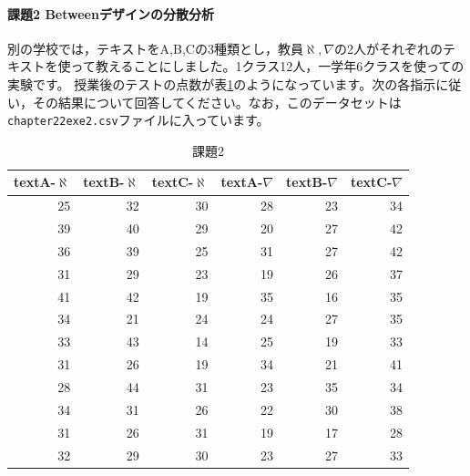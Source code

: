 \documentclass{ltjbook}
\begin{document}
\paragraph{課題2 Betweenデザインの分散分析}
別の学校では，テキストをA,B,Cの3種類とし，教員$\aleph,\nabla$の2人がそれぞれのテキストを使って教えることにしました。1クラス12人，一学年6クラスを使っての実験です。
授業後のテストの点数が表\ref{L23::exe2}のようになっています。次の各指示に従い，その結果について回答してください。なお，このデータセットは\texttt{chapter22exe2.csv}ファイルに入っています。
\begin{table}[ht]
	\centering
	\caption{課題2}
	\begin{tabular}{rrrrrr}
		\hline
		textA-$\aleph$ & textB-$\aleph$ & textC-$\aleph$ & textA-$\nabla$ & textB-$\nabla$ & textC-$\nabla$ \\
		\hline
		25             & 32             & 30             & 28             & 23             & 34             \\
		39             & 40             & 29             & 20             & 27             & 42             \\
		36             & 39             & 25             & 31             & 27             & 42             \\
		31             & 29             & 23             & 19             & 26             & 37             \\
		41             & 42             & 19             & 35             & 16             & 35             \\
		34             & 21             & 24             & 24             & 27             & 35             \\
		33             & 43             & 14             & 25             & 19             & 33             \\
		31             & 26             & 19             & 34             & 21             & 41             \\
		28             & 44             & 31             & 23             & 35             & 34             \\
		34             & 31             & 26             & 22             & 30             & 38             \\
		31             & 26             & 31             & 19             & 17             & 28             \\
		32             & 29             & 30             & 23             & 27             & 33             \\
		\hline
	\end{tabular}
	\label{L23::exe2}
\end{table}
\end{document}
